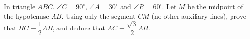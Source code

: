 In triangle $ABC$, $\angle C=90^\circ$, $\angle A=30^\circ$ and $\angle B=60^\circ$. Let $M$ be the midpoint of the hypotenuse $AB$. Using only the segment $CM$ (no other auxiliary lines), prove that $BC=\dfrac{1}{2}AB$, and deduce that $AC=\dfrac{\sqrt3}{2}AB$.
